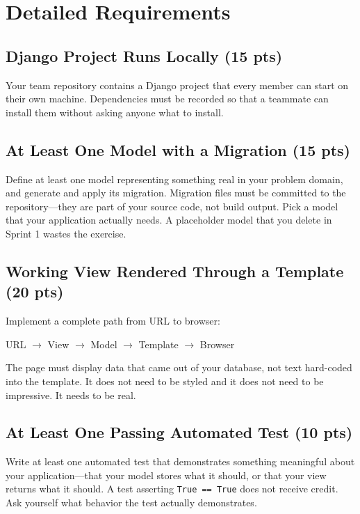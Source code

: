 \documentclass[11pt]{article}
\begin{document}
\section{Detailed Requirements}

\subsection{Django Project Runs Locally (15 pts)}
Your team repository contains a Django project that every member can start on their own machine. Dependencies must be recorded so that a teammate can install them without asking anyone what to install.

\subsection{At Least One Model with a Migration (15 pts)}
Define at least one model representing something real in your problem domain, and generate and apply its migration. Migration files must be committed to the repository---they are part of your source code, not build output. Pick a model that your application actually needs. A placeholder model that you delete in Sprint 1 wastes the exercise.

\subsection{Working View Rendered Through a Template (20 pts)}
Implement a complete path from URL to browser:

\begin{center}
URL $\rightarrow$ View $\rightarrow$ Model $\rightarrow$ Template $\rightarrow$ Browser
\end{center}

The page must display data that came out of your database, not text hard-coded into the template. It does not need to be styled and it does not need to be impressive. It needs to be real.

\subsection{At Least One Passing Automated Test (10 pts)}
Write at least one automated test that demonstrates something meaningful about your application---that your model stores what it should, or that your view returns what it should. A test asserting \texttt{True == True} does not receive credit. Ask yourself what behavior the test actually demonstrates.
\end{document}
